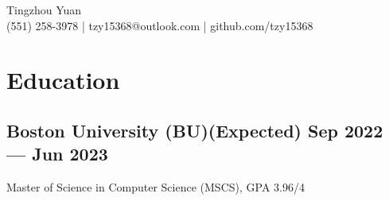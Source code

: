 \documentclass[a4,12pt]{article}
\newcommand{\hskills}[1]{
\textbf{\bfseries #1} }
\begin{document}
\vspace{-0.5cm}
\begin{center}
    \begin{minipage}[b]{0.7\textwidth}
            \centering
            {\huge Tingzhou Yuan} \\ %
            \vspace{0.1cm}
           (551) 258-3978  | tzy15368@outlook.com | github.com/tzy15368
    \end{minipage}%
    
\vspace{-0.35cm} 
\end{center}
\vspace{-0.4cm}

\section{\textbf{Education}}
\vspace{-0.2cm}
\subsection*{Boston University (BU)\hfill \textbf{(Expected) Sep 2022 --- Jun 2023}}
Master of Science in Computer Science (MSCS), GPA 3.96/4\\
\end{document}
